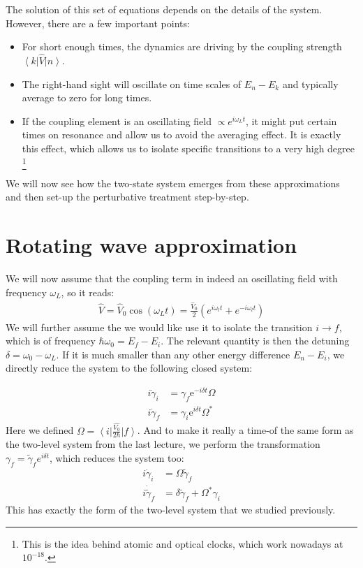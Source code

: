 \documentclass[10pt]{article}
\newcommand{\bra}[1]{\ensuremath{\left\langle#1\right|}}
\newcommand{\ket}[1]{\ensuremath{\left|#1\right\rangle}}
\newcommand{\eexp}[1]{\mathrm{e}^{#1}}
\begin{document}
The solution of this set of equations depends on the details of the system. However, there are a few important points:

\begin{itemize}
\item For short enough times, the dynamics are driving by the coupling strength $\bra{k}\hat{V} \ket{n}$.
\item The right-hand sight will oscillate on time scales of $E_n-E_k$ and typically average to zero for long times.
\item If the coupling element is an oscillating field $\propto e^{i\omega_L t}$, it might put certain times on resonance and allow us to avoid the averaging effect. It is exactly this effect, which allows us to isolate specific transitions to a very high degree \footnote{This is the idea behind atomic and optical clocks, which work nowadays at $10^{-18}$.}
\end{itemize}

We will now see how the two-state system emerges from these approximations and then set-up the perturbative treatment step-by-step.

\section{Rotating wave approximation}
We will now assume that the coupling term in indeed an oscillating field with frequency $\omega_L$, so it reads:
\begin{align}
\hat{V} = \hat{V}_0 \cos(\omega_Lt) = \frac{\hat{V}_0}{2} \left(e^{i\omega_lt}+e^{-i\omega_lt}\right)  
\end{align}
We will further assume the we would like use it to isolate the transition $i\rightarrow f$, which is of frequency $\hbar \omega_0 = E_f - E_i$. The relevant quantity is then the detuning $\delta = \omega_0 - \omega_L$. If it is much smaller than any other energy difference $E_n-E_i$, we directly reduce the system to the following closed system:

\begin{align}
i\dot{\gamma}_i &= \gamma_f \eexp{-i \delta t} \Omega\\
i\dot{\gamma}_f &= \gamma_i \eexp{i \delta t}\Omega^*
\end{align}
Here we defined $\Omega = \bra{i} \frac{\hat{V_0}}{2\hbar}\ket{f}$. And to make it really a time-of the same form as the two-level system from the last lecture, we perform the transformation $\gamma_f = \tilde{\gamma}_f e^{i\delta t}$, which reduces the system too:
\begin{align}
i \dot{\gamma}_i &= \Omega \tilde{\gamma}_f \\
i\dot{\tilde{\gamma}}_f &= \delta \tilde{\gamma}_f + \Omega^* \gamma_i 
\end{align}
This has exactly the form of the two-level system that we studied previously.
\end{document}
